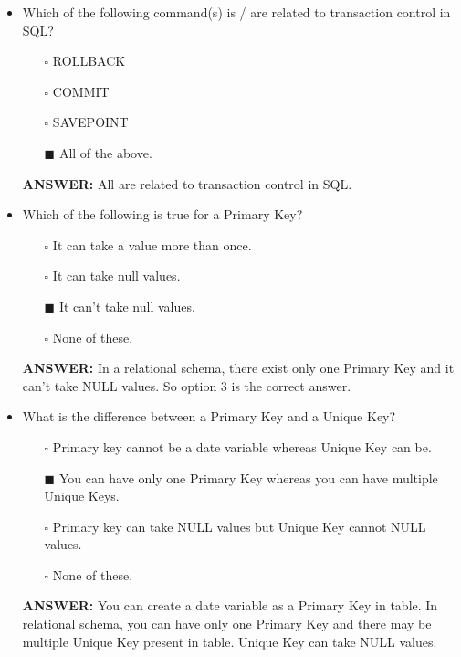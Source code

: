 \documentclass[10pt]{article}
\begin{document}
\begin{itemize}
		\item Which of the following command(s) is /  are related to transaction control in SQL?
			\begin{enumerate}
				\item[$\square$] ROLLBACK
				\item[$\square$] COMMIT
				\item[$\square$] SAVEPOINT
				\item[$\blacksquare$] All of the above.
			\end{enumerate}
			\color{red} \textbf{ANSWER:} \color{black} All are related to transaction control in SQL.

		\item Which of the following is true for a Primary Key?
			\begin{enumerate}
				\item[$\square$] It can take a value more than once.
				\item[$\square$] It can take null values.
				\item[$\blacksquare$] It can’t take null values.
				\item[$\square$] None of these.
			\end{enumerate}
			\color{red} \textbf{ANSWER:} \color{black} In a relational schema, there exist only one Primary Key and it can’t take NULL values. So option 3 is the correct answer.

		\item What is the difference between a Primary Key and a Unique Key?
			\begin{enumerate}
				\item[$\square$] Primary key cannot be a date variable whereas Unique Key can be.
				\item[$\blacksquare$] You can have only one Primary Key whereas you can have multiple Unique Keys.
				\item[$\square$] Primary key can take NULL values but Unique Key cannot NULL values.
				\item[$\square$] None of these.
			\end{enumerate}
			\color{red} \textbf{ANSWER:} \color{black} You can create a date variable as a Primary Key in table. In relational schema, you can have only one Primary Key and there may be multiple Unique Key present in table. Unique Key can take NULL values.

		\newpage


\end{itemize}
\end{document}
